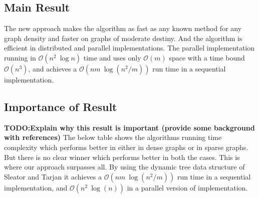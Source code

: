 \subsection*{Main Result}
    The new approach makes the algorithm as fast as any known method for any
    graph density and faster on graphs of moderate destiny. And the algorithm
    is efficient in distributed and parallel implementations. The parallel
    implementation running in $\mathcal{O} (n^2\ \log{n})$ time and uses only
    $\mathcal{O}(m)$ space with a time bound $\mathcal{O}(n^3)$, and 
    achieves a $\mathcal{O}(nm\ \log{(n^2/m)})$ run
    time in a sequential implementation.

\subsection*{Importance of Result}
    \textbf{TODO:Explain why this result is important (provide some background with
    references)}
    \newline
    The below table shows the algorithms running time complexity which performs
    better in either in dense graphs or in sparse graphs. But there is no
    clear winner which performs better in both the cases. This is where our
    approach surpasses all. By using the dynamic tree data structure \cite{Sleator:1983:DSD:61337.61338} 
    of Sleator and Tarjan it achieves a $\mathcal{O}(nm\ \log{(n^2/m)})$ run
    time in a sequential implementation, and $\mathcal{O}(n^2\ \log(n))$ in a
    parallel version of implementation. 
    \newline
